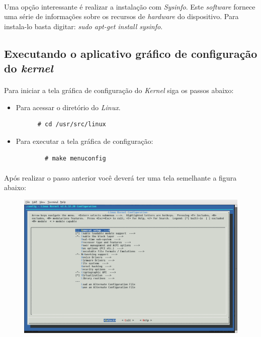 \documentclass[a4paper,10pt]{article}
\begin{document}
    \paragraph{}
    Uma opção interessante é realizar a instalação com \emph{Sysinfo}. Este \emph{software} fornece uma série de informações 
    sobre os recursos de \emph{hardware} do dispositivo. Para instala-lo basta digitar: \emph{sudo apt-get install sysinfo}.

  \subsection{Executando o aplicativo gráfico de configuração do \emph{kernel}}
    \paragraph{}
    Para iniciar a tela gráfica de configuração do \emph{Kernel} siga os passos abaixo:
      \begin{itemize}
	\item Para acessar o diretório do \emph{Linux}.
	  \begin{lstlisting}
	  # cd /usr/src/linux
	  \end{lstlisting}

	\item Para executar a tela gráfica de configuração:
	  \begin{lstlisting}
	    # make menuconfig
	  \end{lstlisting}
      \end{itemize}

    \paragraph{}
    Após realizar o passo anterior você deverá ter uma tela semelhante a figura abaixo:
      \begin{figure}[ht]
	\center
	\includegraphics[width=13cm]{images/PrimeiraTela.png}
      \end{figure}
\end{document}
